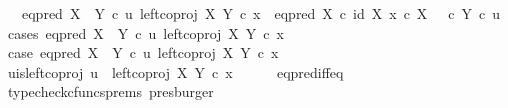 \begin{isabellebody}
\ \ \ {\isachardoublequoteopen}eq{\isacharunderscore}{\kern0pt}pred\ {\isacharparenleft}{\kern0pt}X\ {\isasymCoprod}\ Y{\isacharparenright}{\kern0pt}\ {\isasymcirc}\isactrlsub c\ {\isasymlangle}u{\isacharcomma}{\kern0pt}\ left{\isacharunderscore}{\kern0pt}coproj\ X\ Y\ {\isasymcirc}\isactrlsub c\ x{\isasymrangle}\ {\isacharequal}{\kern0pt}\ {\isacharparenleft}{\kern0pt}{\isacharparenleft}{\kern0pt}eq{\isacharunderscore}{\kern0pt}pred\ X\ {\isasymcirc}\isactrlsub c\ {\isasymlangle}id\ X{\isacharcomma}{\kern0pt}\ x\ {\isasymcirc}\isactrlsub c\ {\isasymbeta}\isactrlbsub X\isactrlesub {\isasymrangle}{\isacharparenright}{\kern0pt}\ {\isasymamalg}\ {\isacharparenleft}{\kern0pt}{\isasymf}\ {\isasymcirc}\isactrlsub c\ {\isasymbeta}\isactrlbsub Y\isactrlesub {\isacharparenright}{\kern0pt}{\isacharparenright}{\kern0pt}\ {\isasymcirc}\isactrlsub c\ u{\isachardoublequoteclose}\isanewline
%
\isadelimproof
%
\endisadelimproof
%
\isatagproof
{}\isamarkupfalse%
\ {\isacharparenleft}{\kern0pt}cases\ {\isachardoublequoteopen}eq{\isacharunderscore}{\kern0pt}pred\ {\isacharparenleft}{\kern0pt}X\ {\isasymCoprod}\ Y{\isacharparenright}{\kern0pt}\ {\isasymcirc}\isactrlsub c\ {\isasymlangle}u{\isacharcomma}{\kern0pt}\ left{\isacharunderscore}{\kern0pt}coproj\ X\ Y\ {\isasymcirc}\isactrlsub c\ x{\isasymrangle}{\isacharequal}{\kern0pt}\ {\isasymt}{\isachardoublequoteclose}{\isacharparenright}{\kern0pt}\isanewline
\ \ \isamarkupfalse%
\ case{}{\isacharcolon}{\kern0pt}\ {\isachardoublequoteopen}eq{\isacharunderscore}{\kern0pt}pred\ {\isacharparenleft}{\kern0pt}X\ {\isasymCoprod}\ Y{\isacharparenright}{\kern0pt}\ {\isasymcirc}\isactrlsub c\ {\isasymlangle}u{\isacharcomma}{\kern0pt}\ left{\isacharunderscore}{\kern0pt}coproj\ X\ Y\ {\isasymcirc}\isactrlsub c\ x{\isasymrangle}\ {\isacharequal}{\kern0pt}\ {\isasymt}{\isachardoublequoteclose}\isanewline
\ \ \isamarkupfalse%
\ \isamarkupfalse%
\ u{\isacharunderscore}{\kern0pt}is{\isacharunderscore}{\kern0pt}left{\isacharunderscore}{\kern0pt}coproj{\isacharcolon}{\kern0pt}\ {\isachardoublequoteopen}u\ {\isacharequal}{\kern0pt}\ left{\isacharunderscore}{\kern0pt}coproj\ X\ Y\ {\isasymcirc}\isactrlsub c\ x{\isachardoublequoteclose}\isanewline
\ \ \ \ \isamarkupfalse%
\ eq{\isacharunderscore}{\kern0pt}pred{\isacharunderscore}{\kern0pt}iff{\isacharunderscore}{\kern0pt}eq\ \isamarkupfalse%
\ {\isacharparenleft}{\kern0pt}typecheck{\isacharunderscore}{\kern0pt}cfuncs{\isacharunderscore}{\kern0pt}prems{\isacharcomma}{\kern0pt}\ presburger{\isacharparenright}{\kern0pt}\ \ \isanewline

\end{isabellebody}
